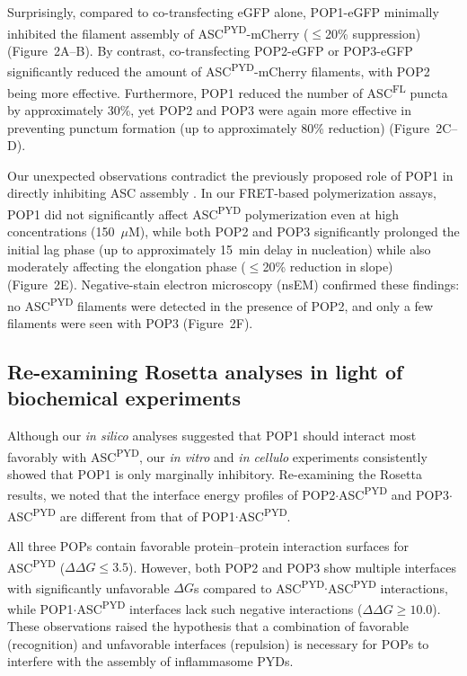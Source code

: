 \documentclass[11pt]{article}
\begin{document}
Surprisingly, compared to co-transfecting eGFP alone, POP1-eGFP minimally inhibited the filament assembly of ASC\textsuperscript{PYD}-mCherry ($\leq$20\% suppression) (Figure~2A--B). By contrast, co-transfecting POP2-eGFP or POP3-eGFP significantly reduced the amount of ASC\textsuperscript{PYD}-mCherry filaments, with POP2 being more effective. Furthermore, POP1 reduced the number of ASC\textsuperscript{FL} puncta by approximately 30\%, yet POP2 and POP3 were again more effective in preventing punctum formation (up to approximately 80\% reduction) (Figure~2C--D).

Our unexpected observations contradict the previously proposed role of POP1 in directly inhibiting ASC assembly \citep{dealmeida2015pop1}. In our FRET-based polymerization assays, POP1 did not significantly affect ASC\textsuperscript{PYD} polymerization even at high concentrations (150~$\mu$M), while both POP2 and POP3 significantly prolonged the initial lag phase (up to approximately 15~min delay in nucleation) while also moderately affecting the elongation phase ($\leq$20\% reduction in slope) (Figure~2E). Negative-stain electron microscopy (nsEM) confirmed these findings: no ASC\textsuperscript{PYD} filaments were detected in the presence of POP2, and only a few filaments were seen with POP3 (Figure~2F).

\subsection{Re-examining Rosetta analyses in light of biochemical experiments}

Although our \textit{in silico} analyses suggested that POP1 should interact most favorably with ASC\textsuperscript{PYD}, our \textit{in vitro} and \textit{in cellulo} experiments consistently showed that POP1 is only marginally inhibitory. Re-examining the Rosetta results, we noted that the interface energy profiles of POP2$\cdot$ASC\textsuperscript{PYD} and POP3$\cdot$ASC\textsuperscript{PYD} are different from that of POP1$\cdot$ASC\textsuperscript{PYD}.

All three POPs contain favorable protein--protein interaction surfaces for ASC\textsuperscript{PYD} ($\Delta\Delta G \leq 3.5$). However, both POP2 and POP3 show multiple interfaces with significantly unfavorable $\Delta G$s compared to ASC\textsuperscript{PYD}$\cdot$ASC\textsuperscript{PYD} interactions, while POP1$\cdot$ASC\textsuperscript{PYD} interfaces lack such negative interactions ($\Delta\Delta G \geq 10.0$). These observations raised the hypothesis that a combination of favorable (recognition) and unfavorable interfaces (repulsion) is necessary for POPs to interfere with the assembly of inflammasome PYDs.
\end{document}
